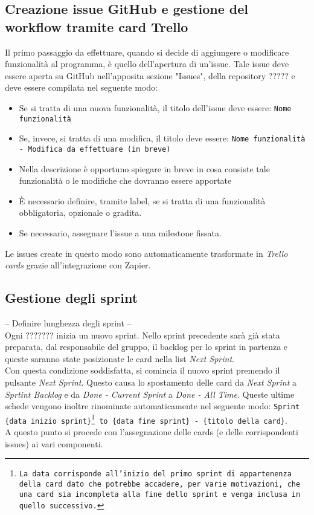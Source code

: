 \subsection{Creazione issue GitHub e gestione del workflow tramite card Trello}
Il primo passaggio da effettuare, quando si decide di aggiungere o modificare funzionalità al programma, è quello dell'apertura di un'issue.
Tale issue deve essere aperta su GitHub nell'apposita sezione "Issues", della repository ????? e deve essere compilata nel seguente modo:
\begin{itemize}
    \item Se si tratta di una nuova funzionalità, il titolo dell'issue deve essere: \texttt{Nome funzionalità}
    \item Se, invece, si tratta di una modifica, il titolo deve essere:
    \texttt{Nome funzionalità - Modifica da effettuare (in breve)}
    \item Nella descrizione è opportuno spiegare in breve in cosa consiste tale funzionalità o le modifiche che dovranno essere apportate
    \item È necessario definire, tramite label, se si tratta di una funzionalità obbligatoria, opzionale o gradita.
    \item Se necessario, assegnare l'issue a una milestone fissata.
\end{itemize}
Le issues create in questo modo sono automaticamente trasformate in \textit{Trello cards} grazie all'integrazione con Zapier.
\subsection{Gestione degli sprint}
-- Definire lunghezza degli sprint --\\
Ogni ??????? inizia un nuovo sprint. Nello sprint precedente sarà già stata preparata, dal responsabile del gruppo, il backlog per lo sprint in partenza e queste saranno state posizionate le card nella list \textit{Next Sprint}. \\
Con questa condizione soddisfatta, si comincia il nuovo sprint premendo il pulsante \textit{Next Sprint}. Questo causa lo spostamento delle card da \textit{Next Sprint} a \textit{Sprtint Backlog} e da \textit{Done - Current Sprint} a \textit{Done - All Time}. Queste ultime schede vengono inoltre rinominate automaticamente nel seguente modo: \texttt{Sprint \{data inizio sprint\}\footnote{La data corrisponde all'inizio del primo sprint di appartenenza della card dato che potrebbe accadere, per varie motivazioni, che una card sia incompleta alla fine dello sprint e venga inclusa in quello successivo.} to \{data fine sprint\} - \{titolo della card\}}.\\
A questo punto si procede con l'assegnazione delle cards (e delle corrispondenti issues) ai vari componenti.

